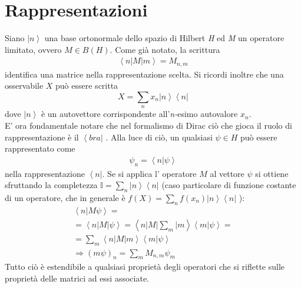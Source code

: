 \section{Rappresentazioni} %
Siano $\left |n \right\rangle$ una base ortonormale dello spazio di Hilbert \textit{H} ed \textit{M} un operatore limitato, ovvero $M\in \textit{B}(H)$.
Come già notato, la scrittura
 \begin{equation}\begin{split}
\left\langle n|M|m \right\rangle=M_{n,m}
 \end{split}\end{equation} identifica una matrice nella rappresentazione scelta.
Si ricordi inoltre che una osservabile $X$ può essere scritta 
 \begin{equation}
X=\sum_{n}{x_n\left |n \right\rangle\left\langle n\right |}
 \end{equation}
dove $\left |n \right\rangle$ è un autovettore corrispondente all'\textit{n-}esimo autovalore $x_n$. \\
E' ora fondamentale notare che nel formalismo di Dirac ciò che gioca il ruolo di rappresentazione è il $\left\langle bra\right |$ .
Alla luce di ciò, un qualsiasi $\psi\in H$ può essere rappresentato come
 \begin{equation}\begin{split}
\psi _n=\left\langle n|\psi  \right\rangle
 \end{split}\end{equation}
nella rappresentazione $\left\langle n\right|$. Se si applica l' operatore $M$ al vettore $\psi$  si ottiene sfruttando la completezza $\mathbb{I}=\sum_{n}{\left |n \right\rangle\left\langle n\right |}$ (caso particolare di funzione costante di un operatore, che in generale è $\textit{f}(X)=\sum_{n}{\textit{f}(x_n)\left |n \right\rangle\left\langle n\right |}$ ):
 \begin{equation}\begin{split}
\left\langle n|M\psi  \right\rangle=\\
=\left\langle n|M|\psi  \right\rangle=\left\langle n|M|\sum_{m}|m \right\rangle\left\langle m|\psi  \right\rangle=\\
=\sum_{m}\left\langle n|M|m \right\rangle\left\langle m|\psi  \right\rangle \\
\Longrightarrow \left(m\psi \right)_n=\sum_{m}{M_{n,m}\psi _m}
 \end{split}\end{equation}
Tutto ciò è estendibile a qualsiasi proprietà degli operatori che si riflette sulle proprietà delle matrici ad essi associate.
